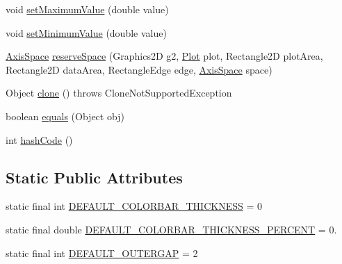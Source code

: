 \begin{DoxyCompactItemize}
\item 
void \mbox{\hyperlink{classorg_1_1jfree_1_1chart_1_1axis_1_1_color_bar_a340823e876258fb78bb62ba19b66694e}{set\+Maximum\+Value}} (double value)
\item 
void \mbox{\hyperlink{classorg_1_1jfree_1_1chart_1_1axis_1_1_color_bar_ac0d65654c2637194a7e0a08e2c99a40f}{set\+Minimum\+Value}} (double value)
\item 
\mbox{\hyperlink{classorg_1_1jfree_1_1chart_1_1axis_1_1_axis_space}{Axis\+Space}} \mbox{\hyperlink{classorg_1_1jfree_1_1chart_1_1axis_1_1_color_bar_a623ac16b72c970cf5a52bc7194883e41}{reserve\+Space}} (Graphics2D g2, \mbox{\hyperlink{classorg_1_1jfree_1_1chart_1_1plot_1_1_plot}{Plot}} plot, Rectangle2D plot\+Area, Rectangle2D data\+Area, Rectangle\+Edge edge, \mbox{\hyperlink{classorg_1_1jfree_1_1chart_1_1axis_1_1_axis_space}{Axis\+Space}} space)
\item 
Object \mbox{\hyperlink{classorg_1_1jfree_1_1chart_1_1axis_1_1_color_bar_aa43e936b97ef8f80578644e378855fa7}{clone}} ()  throws Clone\+Not\+Supported\+Exception 
\item 
boolean \mbox{\hyperlink{classorg_1_1jfree_1_1chart_1_1axis_1_1_color_bar_aa0a90d9d216da845bde9b7eca331fc82}{equals}} (Object obj)
\item 
int \mbox{\hyperlink{classorg_1_1jfree_1_1chart_1_1axis_1_1_color_bar_a5f5947b7df0df04cf6a3ef9f12ff4844}{hash\+Code}} ()
\end{DoxyCompactItemize}
\subsection*{Static Public Attributes}
\begin{DoxyCompactItemize}
\item 
static final int \mbox{\hyperlink{classorg_1_1jfree_1_1chart_1_1axis_1_1_color_bar_a5fbb9925ebd12f5f36f9fc0e850c7293}{D\+E\+F\+A\+U\+L\+T\+\_\+\+C\+O\+L\+O\+R\+B\+A\+R\+\_\+\+T\+H\+I\+C\+K\+N\+E\+SS}} = 0
\item 
static final double \mbox{\hyperlink{classorg_1_1jfree_1_1chart_1_1axis_1_1_color_bar_a3ae872c4132e0f5fff65afac1fc6458c}{D\+E\+F\+A\+U\+L\+T\+\_\+\+C\+O\+L\+O\+R\+B\+A\+R\+\_\+\+T\+H\+I\+C\+K\+N\+E\+S\+S\+\_\+\+P\+E\+R\+C\+E\+NT}} = 0.
\item 
static final int \mbox{\hyperlink{classorg_1_1jfree_1_1chart_1_1axis_1_1_color_bar_a17325c044b868f2d7dbf658b2cf5991a}{D\+E\+F\+A\+U\+L\+T\+\_\+\+O\+U\+T\+E\+R\+G\+AP}} = 2
\end{DoxyCompactItemize}


